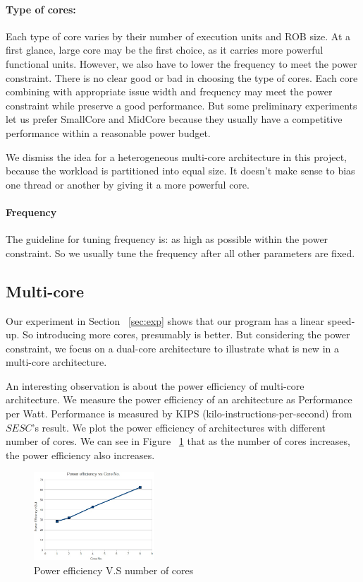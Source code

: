\documentclass[twocolumn,letterpaper,10pt]{article}
\begin{document}
\paragraph{Type of cores:} Each type of core varies by their number of
execution units and ROB size. At a first glance, large core may be the
first choice, as it carries more powerful functional units. However,
we also have to lower the frequency to meet the power
constraint. There is no clear good or bad in choosing the type of
cores. Each core combining with appropriate issue width and frequency
may meet the power constraint while preserve a good performance. But some
preliminary experiments let us prefer SmallCore and MidCore because
they usually have a competitive performance within a reasonable power budget. 

We dismiss the idea for a heterogeneous multi-core architecture in
this project, because the workload is partitioned into equal size. It
doesn't make sense to bias one thread or another by giving it a more
powerful core.

\paragraph{Frequency} The guideline for tuning frequency is: as
high as possible within the power constraint. So we usually tune the
frequency after all other parameters are fixed.

\subsection{Multi-core}
Our experiment in Section ~\ref{sec:exp} shows
that our program has a linear speed-up. So introducing more
cores, presumably is better. But considering the power constraint, we
focus on a dual-core architecture to illustrate what is new in
a multi-core architecture.

An interesting observation is about the power
efficiency of multi-core architecture. We measure the power efficiency of an architecture as Performance per
Watt. Performance is measured by KIPS (kilo-instructions-per-second)
from $SESC$'s result. We plot the power efficiency of architectures
with different number of cores. We can see in Figure ~\ref{fig:power} that as the number of cores
increases, the power efficiency also increases.

\begin{figure}[ht!]
\begin{center}
\includegraphics[width=0.4\textwidth]{figures/efficiency.jpg}
\end{center}
\caption{Power efficiency V.S number of cores}
\label{fig:power}
\end{figure}
\end{document}
